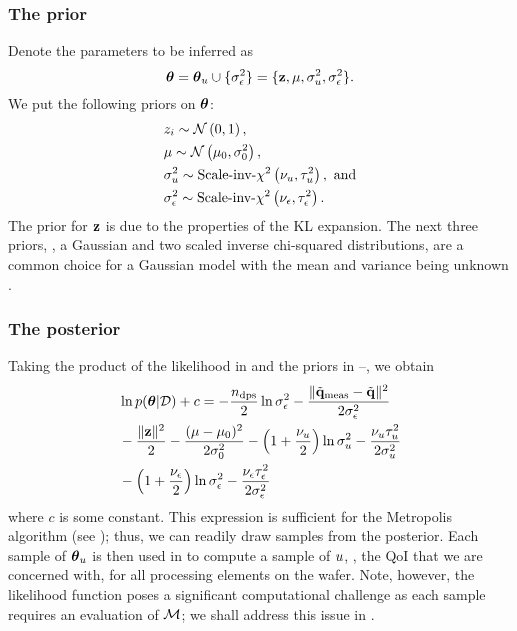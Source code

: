 \subsubsection{The prior}
Denote the parameters to be inferred as
\[
  {\boldsymbol\theta} = {\boldsymbol\theta}_u \cup \{ \sigma_\epsilon^2 \} = \{ \mathbf{z}, \mu, \sigma_u^2, \sigma_\epsilon^2 \}.
\]
We put the following priors on ${\boldsymbol\theta}$:
\begin{align}
  & \z_i \sim \gaussian{0}{1}, \elabel{z-prior} \\
  & \mu \sim \gaussian{\mu_0}{\sigma^2_0}, \elabel{mu-u-prior} \\
  & \sigma^2_\u \sim \sichisquared{\nu_\u}{\tau^2_\u}, \text{ and} \elabel{sigma2-u-prior} \\
  & \sigma^2_\noise \sim \sichisquared{\nu_\noise}{\tau^2_\noise}. \elabel{sigma2-noise-prior}
\end{align}
The prior for $\mathbf{z}$ is due to the properties of the KL expansion. The next three priors, \ie, a Gaussian and two scaled inverse chi-squared distributions, are a common choice for a Gaussian model with the mean and variance being unknown \cite{gelman2004}.

\subsubsection{The posterior}
Taking the product of the likelihood in  and the priors in --, we obtain
\begin{align}
  & \ln \f{\vparam | \Data} + c = -\frac{\ndps}{2} \ln \sigma^2_\noise - \frac{\norm{\mvT_\meas - \mvT}^2}{2 \sigma^2_\noise} \nonumber \\
  & {} - \frac{\norm{\vz}^2}{2} - \frac{(\mu - \mu_0)^2}{2 \sigma^2_0} - \left(1 + \frac{\nu_\u}{2}\right) \ln \sigma^2_\u - \frac{\nu_\u \tau_\u^2}{2 \sigma^2_\u} \nonumber \\
  & {} - \left(1 + \frac{\nu_\noise}{2}\right) \ln \sigma^2_\noise - \frac{\nu_\noise \tau_\noise^2}{2 \sigma^2_\noise} \elabel{log-posterior}
\end{align}
where $c$ is some constant. This expression is sufficient for the Metropolis algorithm (see ); thus, we can readily draw samples from the posterior. Each sample of ${\boldsymbol\theta}_u$ is then used in  to compute a sample of $u$, \ie, the QoI that we are concerned with, for all processing elements on the wafer.
Note, however, the likelihood function poses a significant computational challenge as each sample requires an evaluation of $\model$; we shall address this issue in .
